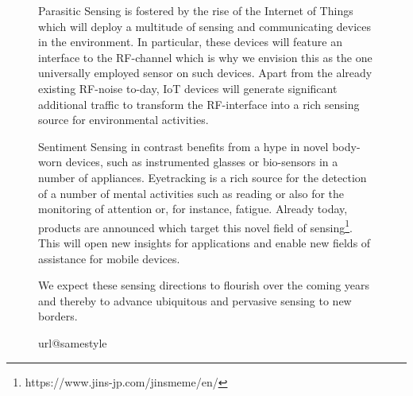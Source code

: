 \documentclass[journal]{IEEEtran}
\begin{document}
\begin{figure*}
Parasitic Sensing is fostered by the rise of the Internet of Things which will deploy a multitude of sensing and communicating devices in the environment.
In particular, these devices will feature an interface to the RF-channel which is why we envision this as the one universally employed sensor on such devices.
Apart from the already existing RF-noise to-day, IoT devices will generate significant additional traffic to transform the RF-interface into a rich sensing source for environmental activities. 

Sentiment Sensing in contrast benefits from a hype in novel body-worn devices, such as instrumented glasses or bio-sensors in a number of appliances.
Eyetracking is a rich source for the detection of a number of mental activities such as reading or also for the monitoring of attention or, for instance, fatigue.
Already today, products are announced which target this novel field of sensing\footnote{https://www.jins-jp.com/jinsmeme/en/}.
This will open new insights for applications and enable new fields of assistance for mobile devices.

We expect these sensing directions to flourish over the coming years and thereby to advance ubiquitous and pervasive sensing to new borders. 















\ifCLASSOPTIONcaptionsoff
  \newpage
\fi












\begin{thebibliography}{100}
\providecommand{\url}[1]{#1}
\csname url@samestyle\endcsname
\providecommand{\newblock}{\relax}
\providecommand{\bibinfo}[2]{#2}
\providecommand{\BIBentrySTDinterwordspacing}{\spaceskip=0pt\relax}
\providecommand{\BIBentryALTinterwordstretchfactor}{4}
\providecommand{\BIBentryALTinterwordspacing}{\spaceskip=\fontdimen2\font plus
\BIBentryALTinterwordstretchfactor\fontdimen3\font minus
  \fontdimen4\font\relax}
\providecommand{\BIBforeignlanguage}[2]{{\expandafter\ifx\csname l@#1\endcsname\relax
\typeout{** WARNING: IEEEtran.bst: No hyphenation pattern has been}\typeout{** loaded for the language `#1'. Using the pattern for}\typeout{** the default language instead.}\else
\language=\csname l@#1\endcsname
\fi
#2}}
\providecommand{\BIBdecl}{\relax}
\BIBdecl


\end{thebibliography}
\end{figure*}
\end{document}
